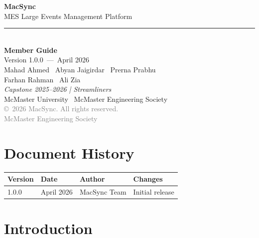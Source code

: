 \documentclass[12pt, twoside]{report}
\newcommand{\version}{1.0.0}
\newcommand{\releasedate}{April 2026}
\begin{document}
\begin{titlepage}
  \centering
  \vspace*{2cm}


  {\Huge\bfseries\color{MacSyncPrimary} MacSync}\\[0.4cm]
  {\Large\color{DarkGray} MES Large Events Management Platform}\\[0.2cm]
  \noindent\rule{\textwidth}{1pt}\\[0.4cm]
  {\LARGE\bfseries Member Guide}\\[0.2cm]
  {\large Version \version\ ---\ \releasedate}\\[2cm]

  {\large Mahad Ahmed \textbullet\ Abyan Jaigirdar \textbullet\ Prerna Prabhu\\
  Farhan Rahman \textbullet\ Ali Zia}\\[0.4cm]
  {\normalsize\textit{Capstone 2025--2026 | Streamliners}}\\[0.6cm]
  {\large McMaster University \textbullet\ McMaster Engineering Society}\\[1cm]

  \vfill
  {\small\textcolor{gray}{\copyright\ 2026 MacSync. All rights reserved.\\
  McMaster Engineering Society}}
\end{titlepage}

\setcounter{page}{1}

\chapter*{Document History}
\begin{longtable}{@{} p{2cm} p{2.5cm} p{4cm} p{5cm} @{}}
  \toprule
  \textbf{Version} & \textbf{Date} & \textbf{Author} & \textbf{Changes} \\
  \midrule
  \endhead
  1.0.0 & April 2026 & MacSync Team & Initial release \\
  \bottomrule
\end{longtable}

\tableofcontents
\clearpage

\setcounter{page}{1}



\chapter{Introduction}
\end{document}
